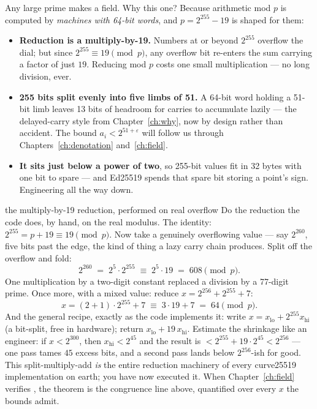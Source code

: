 Any large prime makes a field. Why this one? Because arithmetic mod $p$ is
computed by \emph{machines with 64-bit words}, and $p = 2^{255}-19$ is shaped
for them:

\begin{itemize}[leftmargin=1.4em]
\item \textbf{Reduction is a multiply-by-19.} Numbers at or beyond $2^{255}$
  overflow the dial; but since $2^{255} \equiv 19 \pmod p$, any overflow bit
  re-enters the sum carrying a factor of just $19$. Reducing mod $p$ costs
  one small multiplication --- no long division, ever.
\item \textbf{255 bits split evenly into five limbs of 51.} A 64-bit word
  holding a 51-bit limb leaves 13 bits of headroom for carries to accumulate
  lazily --- the delayed-carry style from Chapter~\ref{ch:why}, now by design
  rather than accident. The bound $a_i < 2^{51+\varepsilon}$ will follow us
  through Chapters~\ref{ch:denotation} and~\ref{ch:field}.
\item \textbf{It sits just below a power of two}, so 255-bit values fit in 32
  bytes with one bit to spare --- and Ed25519 spends that spare bit storing a
  point's sign. Engineering all the way down.
\end{itemize}

\begin{worked}{the multiply-by-19 reduction, performed on real overflow}
Do the reduction the code does, by hand, on the real modulus. The
identity: $2^{255} = p + 19 \equiv 19 \pmod p$. Now take a genuinely
overflowing value --- say $2^{260}$, five bits past the edge, the kind of
thing a lazy carry chain produces. Split off the overflow and fold:
\[
2^{260} \;=\; 2^{5} \cdot 2^{255}
\;\equiv\; 2^{5} \cdot 19
\;=\; 608 \pmod{p}.
\]
One multiplication by a two-digit constant replaced a division by a
77-digit prime. Once more, with a mixed value: reduce
$x = 2^{256} + 2^{255} + 7$:
\[
x = (2 + 1)\cdot 2^{255} + 7 \;\equiv\; 3 \cdot 19 + 7 \;=\; 64 \pmod p .
\]
And the general recipe, exactly as the code implements it: write
$x = x_{\mathrm{lo}} + 2^{255} x_{\mathrm{hi}}$ (a bit-split, free in
hardware); return $x_{\mathrm{lo}} + 19\, x_{\mathrm{hi}}$. Estimate the
shrinkage like an engineer: if $x < 2^{300}$, then
$x_{\mathrm{hi}} < 2^{45}$ and the result is
$< 2^{255} + 19\cdot 2^{45} < 2^{256}$ --- one pass tames $45$ excess bits,
and a second pass lands below $2^{256}$-ish for good. This
split-multiply-add \emph{is} the entire reduction machinery of every
curve25519 implementation on earth; you have now executed it. When
Chapter~\ref{ch:field} verifies , the theorem is the
congruence line above, quantified over every $x$ the bounds admit.
\end{worked}


